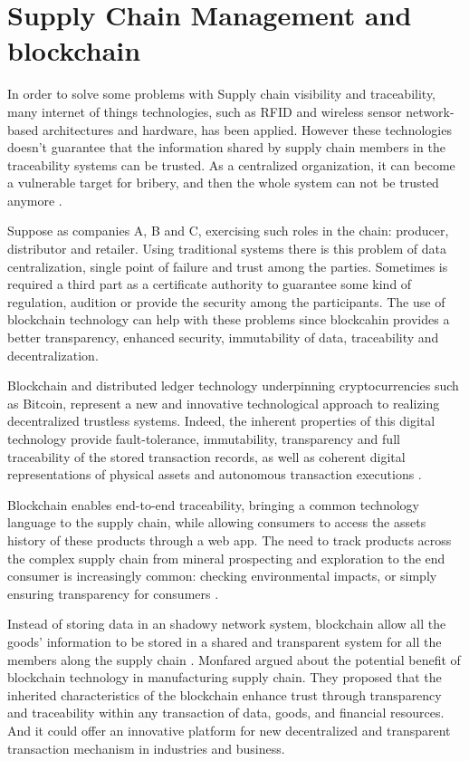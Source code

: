 \section{Supply Chain Management and blockchain}\label{sec:scmBlock}

In order to solve some problems with Supply chain visibility and traceability, many internet of things technologies, such as RFID and wireless sensor network-based architectures and hardware, has been applied. However these technologies doesn't guarantee that the information shared by supply chain members in the traceability systems can be trusted. As a centralized organization, it can become a vulnerable target for bribery, and then the whole system can not be trusted anymore \cite{tian2017supply}.

Suppose as companies A, B and C, exercising such roles in the chain: producer, distributor and retailer. Using traditional systems there is this problem of data centralization, single point of failure and trust among the parties. Sometimes is required a third part as a certificate authority to guarantee some kind of regulation, audition or provide the security among the participants. The use of blockchain technology can help with these problems since blockcahin provides a better transparency, enhanced security, immutability of data, traceability and decentralization. 

Blockchain and distributed ledger technology underpinning cryptocurrencies such as Bitcoin, represent a new and innovative technological approach to realizing decentralized trustless systems. Indeed, the inherent properties of this digital technology provide fault-tolerance, immutability, transparency and full traceability of the stored transaction records, as well as coherent digital representations of physical assets and autonomous transaction executions \cite{caro2018blockchain}.

Blockchain enables end-to-end traceability, bringing a common technology language to the supply chain, while allowing consumers to access the assets history of these products through a web app. The need to track products across the complex supply chain from mineral prospecting and exploration to the end consumer is increasingly common: checking environmental impacts, or simply ensuring transparency for consumers \cite{galvez2018future}.

Instead of storing data in an shadowy network system, blockchain allow all the goods' information to be stored in a shared and transparent system for all the members along the supply chain \cite{tian2017supply}. Monfared \cite{abeyratne2016blockchain} argued about the potential benefit of blockchain technology in manufacturing supply chain. They proposed that the inherited characteristics of the blockchain enhance trust through transparency and traceability within any transaction of data, goods, and financial resources. And it could offer an innovative platform for new decentralized and transparent transaction mechanism in industries and business.

